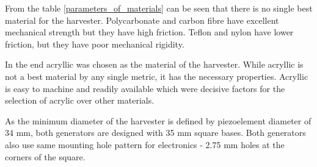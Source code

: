 \begin{table}[htb]
\caption{\label{parameters_of_materials} Materials for the shaft of the generator \cite{PlasticsInternational2015, Etra, Goodfellow, McCarr}.}
\begin{center}

\end{center}
\end{table}

From the table \ref{parameters_of_materials} can be seen that there is no single best material for the harvester. Polycarbonate and carbon fibre  have excellent mechanical strength but they have high friction. Teflon and nylon have lower friction, but they have poor mechanical rigidity. 

In the end acryllic was chosen as the material of the harvester. While acryllic is not a best material by any single metric, it has the necessary properties. Acryllic is easy to machine and readily available which were decisive factors for the selection of acrylic over other materials. 

As the minimum diameter of the harvester is defined by piezoelement diameter of 34 mm, both generators are designed with 35 mm square bases. Both generators also use same mounting hole pattern for electronics - 2.75 mm holes at the corners of the square.

